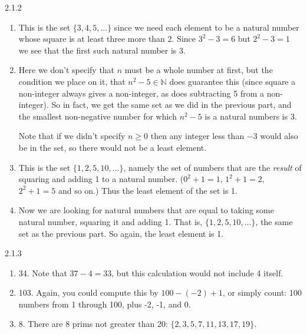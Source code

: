 \documentclass[11pt,]{book}
\theoremstyle{ptxplainnotitle}
\theoremstyle{ptxplaintitle}
\theoremstyle{ptxdefinitionnotitle}
\theoremstyle{ptxdefinitiontitle}
\theoremstyle{ptxdefinitionnotitle}
\theoremstyle{ptxdefinitiontitle}
\theoremstyle{ptxdefinitionnotitle}
\theoremstyle{ptxdefinitiontitle}
\theoremstyle{ptxdefinitiontitlenonumber}
\theoremstyle{ptxdefinitiontitlenonumber}
\numberwithin{equation}{chapter}
\newcommand{\N}{\mathbb N}
\begin{document}
\begin{divisionexercise}{2.1.2}
\textbf{}\hypertarget{p-819}{}%
\leavevmode%
\begin{enumerate}[label=(\alph*)]
\item\hypertarget{li-361}{}\hypertarget{p-820}{}%
This is the set \(\{3, 4, 5, \ldots \}\) since we need each element to be a natural number whose square is at least three more than 2.  Since \(3^2 - 3 = 6\) but \(2^2 - 3 = 1\) we see that the first such natural number is 3.%
\item\hypertarget{li-362}{}\hypertarget{p-821}{}%
Here we don't specify that \(n\) must be a whole number at first, but the condition we place on it, that \(n^2 - 5 \in \N\) does guarantee this (since square a non-integer always gives a non-integer, as does subtracting 5 from a non-integer).  So in fact, we get the same set as we did in the previous part, and the smallest non-negative number for which \(n^2 - 5\) is a natural numbers is 3.%
\par
\hypertarget{p-822}{}%
Note that if we didn't specify \(n \ge 0\) then any integer less than \(-3\) would also be in the set, so there would not be a least element.%
\item\hypertarget{li-363}{}\hypertarget{p-823}{}%
This is the set \(\{1, 2, 5, 10, \ldots\}\text{,}\) namely the set of numbers that are the \emph{result} of squaring and adding 1 to a natural number.  (\(0^2 + 1 = 1\text{,}\) \(1^2 + 1 = 2\text{,}\) \(2^2 + 1 = 5\) and so on.)  Thus the least element of the set is 1.%
\item\hypertarget{li-364}{}\hypertarget{p-824}{}%
Now we are looking for natural numbers that are equal to taking some natural number, squaring it and adding 1.  That is, \(\{1, 2, 5, 10, \ldots\}\text{,}\) the same set as the previous part.  So again, the least element is 1.%
\end{enumerate}
%
\end{divisionexercise}%
\begin{divisionexercise}{2.1.3}
\textbf{}\hypertarget{p-843}{}%
\leavevmode%
\begin{enumerate}[label=(\alph*)]
\item\hypertarget{li-374}{}\hypertarget{p-844}{}%
34. Note that \(37-4 = 33\text{,}\) but this calculation would not include 4 itself.%
\item\hypertarget{li-375}{}\hypertarget{p-845}{}%
103. Again, you could compute this by \(100-(-2)+1\text{,}\) or simply count: 100 numbers from 1 through 100, plus -2, -1, and 0.%
\item\hypertarget{li-376}{}\hypertarget{p-846}{}%
8. There are 8 prims not greater than 20: \(\{2, 3, 5, 7, 11, 13, 17, 19\}\text{.}\)%
\end{enumerate}
%
\end{divisionexercise}%
\end{document}
